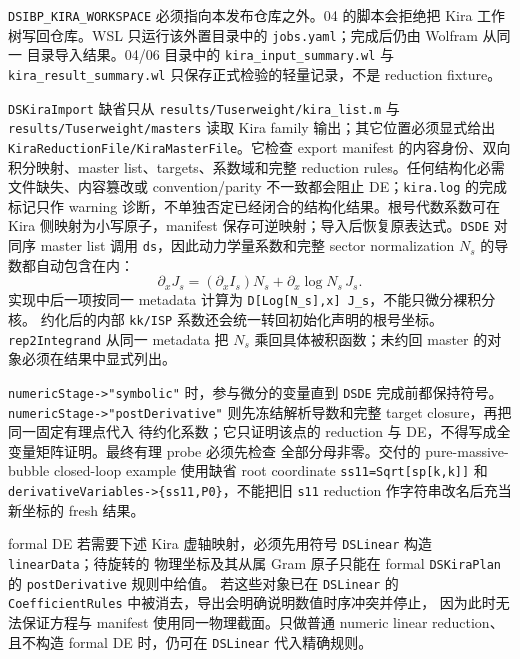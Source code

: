 ﻿\documentclass[a4paper,11pt]{article}
\begin{document}
\texttt{DSIBP\_KIRA\_WORKSPACE} 必须指向本发布仓库之外。04 的脚本会拒绝把
Kira 工作树写回仓库。WSL 只运行该外置目录中的 \texttt{jobs.yaml}；完成后仍由 Wolfram 从同一
目录导入结果。04/06 目录中的 \texttt{kira\_input\_summary.wl} 与
\texttt{kira\_result\_summary.wl} 只保存正式检验的轻量记录，不是 reduction fixture。

\texttt{DSKiraImport} 缺省只从 \texttt{results/Tuserweight/kira\_list.m} 与 \texttt{results/Tuserweight/masters} 读取 Kira family 输出；其它位置必须显式给出 \texttt{KiraReductionFile/KiraMasterFile}。它检查 export manifest 的内容身份、双向积分映射、master list、targets、系数域和完整 reduction rules。任何结构化必需文件缺失、内容篡改或 convention/parity 不一致都会阻止 DE；\texttt{kira.log} 的完成标记只作 warning 诊断，不单独否定已经闭合的结构化结果。根号代数系数可在 Kira 侧映射为小写原子，manifest 保存可逆映射；导入后恢复原表达式。\texttt{DSDE} 对同序 master list 调用 \texttt{ds}，因此动力学量系数和完整 sector normalization $N_s$ 的导数都自动包含在内：
\begin{equation}
 \partial_x J_s=\left(\partial_x I_s\right)N_s+\partial_x\log N_s\,J_s.
\end{equation}
实现中后一项按同一 metadata 计算为 \texttt{D[Log[N\_s],x] J\_s}，不能只微分裸积分核。
约化后的内部 \texttt{kk/ISP} 系数还会统一转回初始化声明的根号坐标。\texttt{rep2Integrand} 从同一 metadata 把 $N_s$ 乘回具体被积函数；未约回 master 的对象必须在结果中显式列出。

\texttt{numericStage->"symbolic"} 时，参与微分的变量直到 \texttt{DSDE} 完成前都保持符号。
\texttt{numericStage->"postDerivative"} 则先冻结解析导数和完整 target closure，再把同一固定有理点代入
待约化系数；它只证明该点的 reduction 与 DE，不得写成全变量矩阵证明。最终有理 probe 必须先检查
全部分母非零。交付的 pure-massive-bubble closed-loop example 使用缺省 root coordinate
\texttt{ss11=Sqrt[sp[k,k]]} 和 \texttt{derivativeVariables->\{ss11,P0\}}，不能把旧 \texttt{s11}
reduction 作字符串改名后充当新坐标的 fresh 结果。

formal DE 若需要下述 Kira 虚轴映射，必须先用符号 \texttt{DSLinear} 构造 \texttt{linearData}；待旋转的
物理坐标及其从属 Gram 原子只能在 formal \texttt{DSKiraPlan} 的 \texttt{postDerivative} 规则中给值。
若这些对象已在 \texttt{DSLinear} 的 \texttt{CoefficientRules} 中被消去，导出会明确说明数值时序冲突并停止，
因为此时无法保证方程与 manifest 使用同一物理截面。只做普通 numeric linear reduction、且不构造 formal DE
时，仍可在 \texttt{DSLinear} 代入精确规则。
\end{document}
